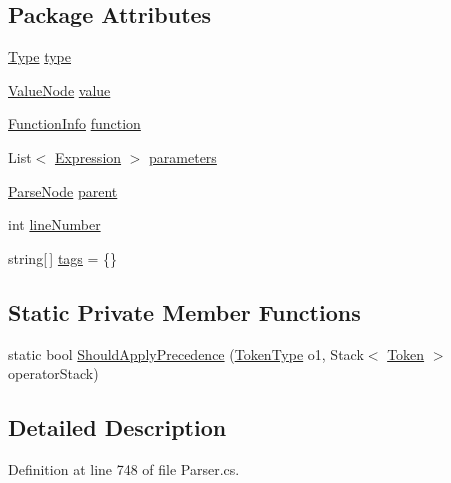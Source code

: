 \subsection*{Package Attributes}
\begin{DoxyCompactItemize}
\item 
\hyperlink{a00106_aceddb5496ccffe668bced2d131e4bf86}{Type} \hyperlink{a00106_ad55c92df835006328bc2a79a8f91efb9}{type}
\item 
\hyperlink{a00190}{Value\-Node} \hyperlink{a00106_a569e516782891544c334ff8131b23108}{value}
\item 
\hyperlink{a00108}{Function\-Info} \hyperlink{a00106_a9c1859ce5ad4c86ded8dd0d61da61320}{function}
\item 
List$<$ \hyperlink{a00106}{Expression} $>$ \hyperlink{a00106_a7b21380bead8ae08b2cfc6594edab32c}{parameters}
\item 
\hyperlink{a00150}{Parse\-Node} \hyperlink{a00150_af313a82103fcc2ff5a177dbb06b92f7b}{parent}
\item 
int \hyperlink{a00150_a18b493382de0fde5b4299c1bd2250075}{line\-Number}
\item 
string\mbox{[}$\,$\mbox{]} \hyperlink{a00150_a58b3a15788fd2d4127d73619dc6d04ae}{tags} = \{\}
\end{DoxyCompactItemize}
\subsection*{Static Private Member Functions}
\begin{DoxyCompactItemize}
\item 
static bool \hyperlink{a00106_a5004a8eaa00b2b55856ecb4f339033fb}{Should\-Apply\-Precedence} (\hyperlink{a00053_a301aa7c866593a5b625a8fc158bbeace}{Token\-Type} o1, Stack$<$ \hyperlink{a00175}{Token} $>$ operator\-Stack)
\end{DoxyCompactItemize}


\subsection{Detailed Description}


Definition at line 748 of file Parser.\-cs.



